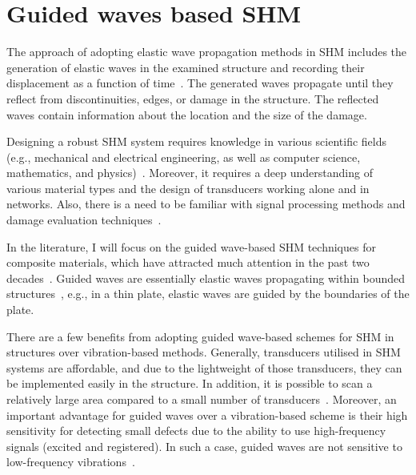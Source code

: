 \section[Guided waves based SHM]{Guided waves based SHM}
\label{sec22}
The approach of adopting elastic wave propagation methods in SHM includes the generation of elastic waves in the examined structure and recording their displacement as a function of time~\cite{Ostachowicz2012}. 
The generated waves propagate until they reflect from discontinuit\-ies, edges, or damage in the structure. 
The reflected waves contain informa\-tion about the location and the size of the damage.

Designing a robust SHM system requires knowledge in various scientific fields (e.g., mechanical and electrical engineering, as well as computer science, mathematics, and physics)~\cite{Willberg2013}.
Moreover, it requires a deep understanding of various material types and the design of transducers working alone and in networks.
Also, there is a need to be familiar with signal processing methods and damage evaluation techniques~\cite{Willberg2013}.

In the literature, I will focus on the guided wave-based SHM techniques for composite materials, which have attracted much attention in the past two decades~\cite{Mitra2016}.
Guided waves are essentially elastic waves propagating within bounded 
structures~\cite{Mitra2016}, e.g., in a thin plate, elastic waves are guided by the boundaries of the plate.

There are a few benefits from adopting guided wave-based schemes for SHM in structures over vibration-based methods. 
Generally, transducers utilised in SHM systems are affordable, and due to the lightweight of those transducers, they can be implemented easily in the structure.
In addition, it is possible to scan a relatively large area compared to a small number of transducers~\cite{Mitra2016}. 
Moreover, an important advantage for guided waves over a vibration-based scheme is their high sensitivity for detecting small defects due to the ability to use high-frequency signals (excited and registered).
In such a case, guided waves are not sensitive to low-frequency vibrations~\cite{Mitra2016,Croxford2007}.

